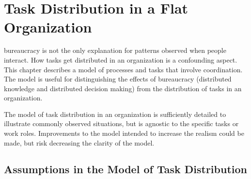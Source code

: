 \chapter{Task Distribution in a Flat Organization\label{sec:work-distribution}}

\Gls{bureaucracy} is not the only explanation for patterns observed when people interact. How tasks get distributed in an organization is a confounding aspect.  This chapter describes a model of processes and tasks that involve coordination. 
The model is useful for distinguishing the effects of bureaucracy (distributed knowledge and distributed decision making) from the distribution of tasks in an organization.

The model of task distribution in an organization is sufficiently detailed to illustrate commonly observed situations, but is agnostic to the specific tasks or work roles. Improvements to the model intended to increase the realism could be made, but risk decreasing the clarity of the model.

\section{Assumptions in the Model of Task Distribution}

